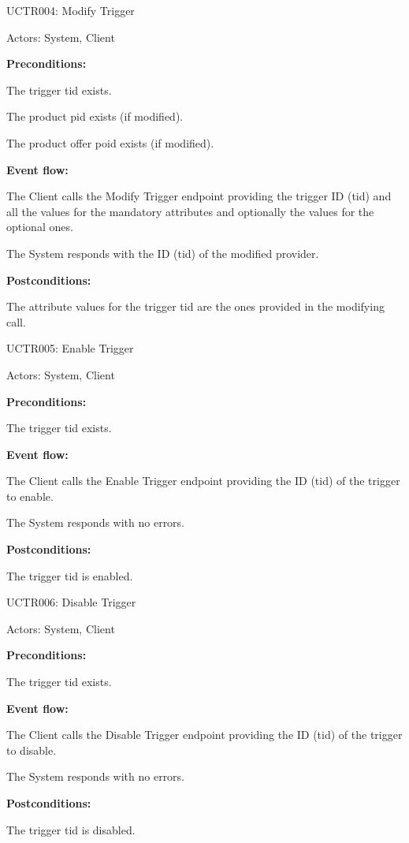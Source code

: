 \begin{ucbox}{UCTR004: Modify Trigger}
\label{UCTR004}

Actors: System, Client

\textbf{Preconditions:}

\ucitem The trigger tid exists.

\ucitem The product pid exists (if modified).

\ucitem The product offer poid exists (if modified).

\textbf{Event flow:}

\ucitem The Client calls the Modify Trigger endpoint providing the trigger ID (tid) and all the values for the mandatory attributes and optionally the values for the optional ones.

\ucitem The System responds with the ID (tid) of the modified provider.

\textbf{Postconditions:}

\ucitem The attribute values for the trigger tid are the ones provided in the modifying call.

\end{ucbox}

\begin{ucbox}{UCTR005: Enable Trigger}
\label{UCTR005}

Actors: System, Client

\textbf{Preconditions:}

\ucitem The trigger tid exists.

\textbf{Event flow:}

\ucitem The Client calls the Enable Trigger endpoint providing the ID (tid) of the trigger to enable.

\ucitem The System responds with no errors.

\textbf{Postconditions:}

\ucitem The trigger tid is enabled.

\end{ucbox}

\begin{ucbox}{UCTR006: Disable Trigger}
\label{UCTR006}

Actors: System, Client

\textbf{Preconditions:}

\ucitem The trigger tid exists.

\textbf{Event flow:}

\ucitem The Client calls the Disable Trigger endpoint providing the ID (tid) of the trigger to disable.

\ucitem The System responds with no errors.

\textbf{Postconditions:}

\ucitem The trigger tid is disabled.

\end{ucbox}

